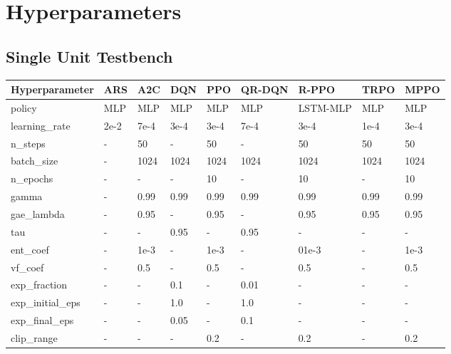 \chapter{Hyperparameters}
\label{appx:hyperparams}

\section{Single Unit Testbench}
\label{app:a}

\begin{table}[htbp]
    \centering
    \begin{tabularx}{\textwidth}{|X|C{1cm}|C{1cm}|C{1cm}|C{1cm}|C{1.2cm}|C{1.3cm}|C{1.2cm}|C{1.3cm}|}
        \hline
        \textbf{Hyperparameter} & \textbf{ARS} & \textbf{A2C} & \textbf{DQN} & \textbf{PPO} & \textbf{QR-DQN} & \textbf{R-PPO} & \textbf{TRPO} & \textbf{MPPO} \\
        \hline
        \hline
        policy & MLP & MLP & MLP & MLP & MLP & LSTM-MLP & MLP & MLP \\
        \hline
        \hline
        learning\_rate & 2e-2 & 7e-4 & 3e-4 & 3e-4 & 7e-4 & 3e-4 & 1e-4 & 3e-4 \\
        \hline
        n\_steps & - & 50 & - & 50 & - & 50 & 50 & 50 \\
        \hline
        batch\_size & - & 1024 & 1024 & 1024 & 1024 & 1024 & 1024 & 1024 \\
        \hline
        n\_epochs & - & - & - & 10 & - & 10 & - & 10 \\
        \hline
        gamma & - & 0.99 & 0.99 & 0.99 & 0.99 & 0.99 & 0.99 & 0.99 \\
        \hline
        gae\_lambda & - & 0.95 & - & 0.95 & - & 0.95 & 0.95 & 0.95 \\
        \hline
        tau & - & - & 0.95 & - & 0.95 & - & - & - \\
        \hline
        ent\_coef & - & 1e-3 & - & 1e-3 & - & 01e-3 & - & 1e-3 \\
        \hline
        vf\_coef & - & 0.5 & - & 0.5 & - & 0.5 & - & 0.5 \\
        \hline
        exp\_fraction & - & - & 0.1 & - & 0.01 & - & - & - \\
        \hline
        exp\_initial\_eps & - & - & 1.0 & - & 1.0 & - & - & - \\
        \hline
        exp\_final\_eps & - & - & 0.05 & - & 0.1 & - & - & - \\
        \hline
        clip\_range & - & - & - & 0.2 & - & 0.2 & - & 0.2 \\

\end{tabularx}
\end{table}
